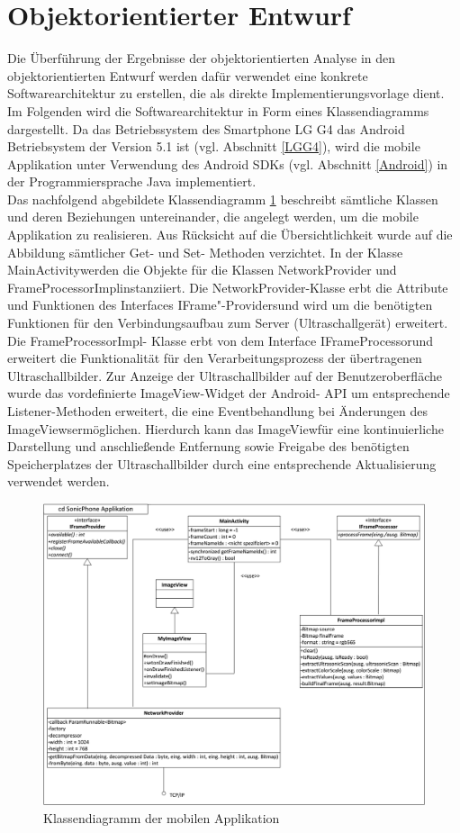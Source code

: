 \section{Objektorientierter Entwurf}
Die Überführung der Ergebnisse der objektorientierten Analyse in den  objektorientierten Entwurf werden dafür verwendet eine konkrete Softwarearchitektur zu erstellen, die als direkte Implementierungsvorlage dient. Im Folgenden wird die Softwarearchitektur in Form eines Klassendiagramms dargestellt. Da das Betriebssystem des Smartphone LG G4 das Android Betriebsystem der Version 5.1 ist (vgl. Abschnitt \ref{LGG4}), wird die mobile Applikation unter Verwendung des Android SDKs (vgl. Abschnitt \ref{Android}) in der Programmiersprache Java implementiert.  \\
Das nachfolgend abgebildete Klassendiagramm \ref{fig:cd_mobileApplikation} beschreibt sämtliche Klassen und deren Beziehungen untereinander, die angelegt werden, um die mobile Applikation zu realisieren. Aus Rücksicht auf die Übersichtlichkeit wurde auf die Abbildung sämtlicher Get- und Set- Methoden verzichtet. In der Klasse \grqq MainActivity\grqq werden die Objekte für die Klassen \grqq NetworkProvider \grqq und \grqq FrameProcessorImpl\grqq \linebreak instanziiert. Die \grqq NetworkProvider\grqq -Klasse erbt die Attribute und Funktionen des Interfaces \grqq IFrame"-Providers\grqq und wird um die benötigten Funktionen für den Verbindungsaufbau zum Server (Ultraschallgerät) erweitert. Die \grqq FrameProcessorImpl\grqq - Klasse erbt von dem Interface \grqq IFrameProcessor\grqq und erweitert die Funktionalität für den Verarbeitungsprozess der übertragenen Ultraschallbilder. Zur Anzeige der Ultraschallbilder auf der Benutzeroberfläche wurde das vordefinierte \grqq ImageView\grqq -Widget der Android- API um entsprechende Listener-Methoden erweitert, die eine Eventbehandlung bei Änderungen des \grqq ImageViews\grqq ermöglichen. Hierdurch kann das \grqq ImageView\grqq  für eine kontinuierliche Darstellung und anschließende Entfernung sowie Freigabe des benötigten Speicherplatzes der Ultraschallbilder durch eine entsprechende Aktualisierung verwendet werden.  

\begin{figure}[H] 
\centering
\includegraphics[width=1\textwidth]{Bilder/objektorientierteAnalyseundEntwurf/cd_mobileApplikation}
\caption{{\small Klassendiagramm der mobilen Applikation}}
\label{fig:cd_mobileApplikation}
\end{figure}
